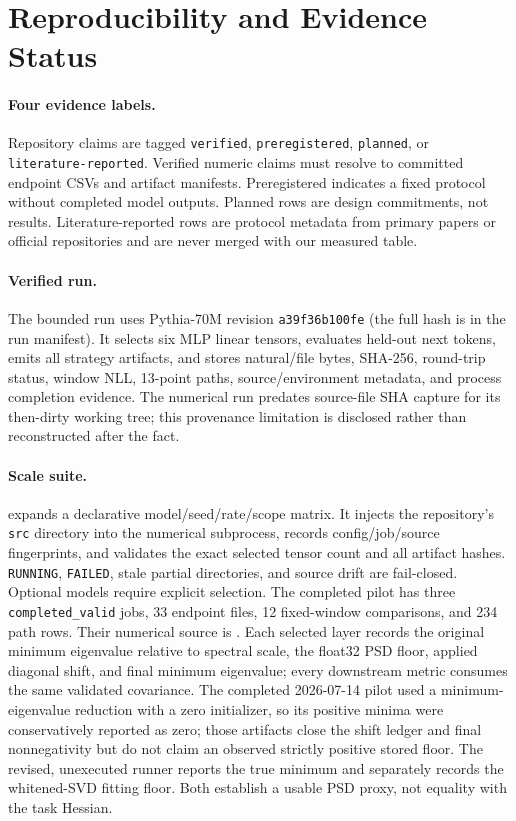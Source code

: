 \section{Reproducibility and Evidence Status}
\label{app:reproducibility}

\paragraph{Four evidence labels.}
Repository claims are tagged \texttt{verified}, \texttt{preregistered},
\texttt{planned}, or \texttt{literature-reported}.  Verified numeric claims
must resolve to committed endpoint CSVs and artifact manifests.
Preregistered indicates a fixed protocol without completed model outputs.
Planned rows are design commitments, not results.  Literature-reported rows
are protocol metadata from primary papers or official repositories and are
never merged with our measured table.

\paragraph{Verified run.}
The bounded run uses Pythia-70M revision
\texttt{a39f36b100fe} (the full hash is in the run manifest).  It selects six MLP
linear tensors, evaluates \VerifiedEvalTokens{} held-out next tokens, emits
all strategy artifacts, and stores natural/file bytes, SHA-256, round-trip
status, window NLL, 13-point paths, source/environment metadata, and process
completion evidence.  The numerical run predates source-file SHA capture for
its then-dirty working tree; this provenance limitation is disclosed rather
than reconstructed after the fact.

\paragraph{Scale suite.}
 expands a declarative
model/seed/rate/scope matrix.  It injects the repository's \texttt{src}
directory into the numerical subprocess, records config/job/source
fingerprints, and validates the exact selected tensor count and all artifact
hashes.  \texttt{RUNNING}, \texttt{FAILED}, stale partial directories, and
source drift are fail-closed.  Optional models require explicit selection.
The completed pilot has three \texttt{completed\_valid} jobs, 33 endpoint
files, 12 fixed-window comparisons, and 234 path rows.  Their numerical source
is \ScalePilotNumericalSourceSHA{}.  Each selected layer records the original
minimum eigenvalue relative to spectral scale, the float32 PSD floor, applied
diagonal shift, and final minimum eigenvalue; every downstream metric consumes
the same validated covariance.  The completed 2026-07-14 pilot used a
minimum-eigenvalue reduction with a zero initializer, so its positive minima
were conservatively reported as zero; those artifacts close the shift ledger
and final nonnegativity but do not claim an observed strictly positive stored
floor.  The revised, unexecuted runner reports the true minimum and separately
records the whitened-SVD fitting floor.  Both establish a usable PSD proxy,
not equality with the task Hessian.

